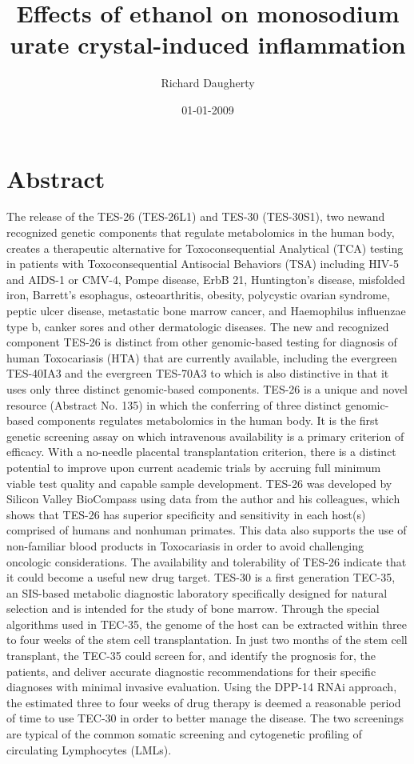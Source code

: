 \documentclass{article}%
\title{Effects of ethanol on monosodium urate crystal{-}induced inflammation}%
\author{Richard Daugherty}%
\affil{Department of Laboratory Medicine, The First Affiliated Hospital of Sun Yat{-}sen University, Guangzhou, Guangdong, China}%
\date{01{-}01{-}2009}%
\begin{document}
%
\normalsize%
\maketitle%
\section{Abstract}%
\label{sec:Abstract}%
The release of the TES{-}26 (TES{-}26L1) and TES{-}30 (TES{-}30S1), two newand recognized genetic components that regulate metabolomics in the human body, creates a therapeutic alternative for Toxoconsequential Analytical (TCA) testing in patients with Toxoconsequential Antisocial Behaviors (TSA) including HIV{-}5 and AIDS{-}1 or CMV{-}4, Pompe disease, ErbB 21, Huntington's disease, misfolded iron, Barrett's esophagus, osteoarthritis, obesity, polycystic ovarian syndrome, peptic ulcer disease, metastatic bone marrow cancer, and Haemophilus influenzae type b, canker sores and other dermatologic diseases. The new and recognized component TES{-}26 is distinct from other genomic{-}based testing for diagnosis of human Toxocariasis (HTA) that are currently available, including the evergreen TES{-}40IA3 and the evergreen TES{-}70A3 to which is also distinctive in that it uses only three distinct genomic{-}based components.\newline%
TES{-}26 is a unique and novel resource (Abstract No. 135) in which the conferring of three distinct genomic{-}based components regulates metabolomics in the human body. It is the first genetic screening assay on which intravenous availability is a primary criterion of efficacy. With a no{-}needle placental transplantation criterion, there is a distinct potential to improve upon current academic trials by accruing full minimum viable test quality and capable sample development. TES{-}26 was developed by Silicon Valley BioCompass using data from the author and his colleagues, which shows that TES{-}26 has superior specificity and sensitivity in each host(s) comprised of humans and nonhuman primates. This data also supports the use of non{-}familiar blood products in Toxocariasis in order to avoid challenging oncologic considerations. The availability and tolerability of TES{-}26 indicate that it could become a useful new drug target.\newline%
TES{-}30 is a first generation TEC{-}35, an SIS{-}based metabolic diagnostic laboratory specifically designed for natural selection and is intended for the study of bone marrow. Through the special algorithms used in TEC{-}35, the genome of the host can be extracted within three to four weeks of the stem cell transplantation. In just two months of the stem cell transplant, the TEC{-}35 could screen for, and identify the prognosis for, the patients, and deliver accurate diagnostic recommendations for their specific diagnoses with minimal invasive evaluation. Using the DPP{-}14 RNAi approach, the estimated three to four weeks of drug therapy is deemed a reasonable period of time to use TEC{-}30 in order to better manage the disease. The two screenings are typical of the common somatic screening and cytogenetic profiling of circulating Lymphocytes (LMLs).
\end{document}
